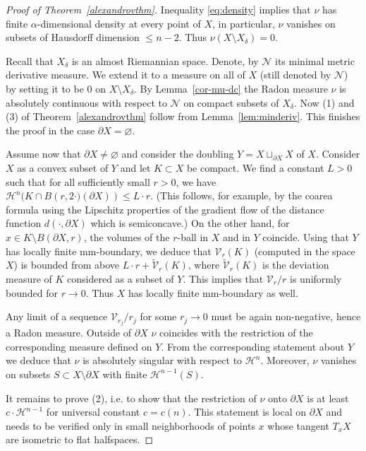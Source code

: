 \documentclass[12pt,leqno,intlimits]{amsart}
\numberwithin{equation}{section}
\theoremstyle{definition}
\theoremstyle{remark}
\newcommand{\tref}[1]{Theorem~\ref{#1}}
\newcommand{\lref}[1]{Lemma~\ref{#1}}
\def\emptyset{\varnothing}
\begin{document}
\begin{proof}[Proof of Theorem~\ref{alexandrovthm}]
Inequality \eqref{eq:density} implies that $\nu$ has finite $\alpha$-dimensional density at every point of $X$, in particular, $\nu$ vanishes on subsets of Hausdorff dimension $\leq n-2$.
Thus $\nu (X \setminus X_{\delta } )=0$.

Recall that $X_{\delta}$ is an almost Riemannian space. Denote, by $\mathcal N $ its minimal metric derivative measure. We extend it to a measure on all of $X$ (still denoted by $\mathcal N $) by setting it to be $0$ on $X\setminus X_{\delta}$.
By \lref{cor-mu-dc} the Radon measure $\nu$ is absolutely continuous with respect to $\mathcal N $ on compact subsets of $X_{\delta}$.
Now (1) and (3) of \tref{alexandrovthm} follow from \lref{lem:minderiv}.
This finishes the proof in the case $\partial X=\emptyset$.

Assume now that $\partial X\ne\emptyset$ and consider the doubling $Y=X\sqcup_{\partial X} X$ of $X$.
Consider $X$ as a convex subset of $Y$ and let $K\subset X$ be compact.
We find a constant $L>0$ such that for all sufficiently small $r>0$, we have
$\mathcal H^n (K\cap B(r,{2{\cdot})} (\partial X)) \leq L \cdot r$.
(This follows, for example, by the coarea formula using the Lipschitz properties of the gradient flow of the distance function $d(\cdot, \partial X)$ which is semiconcave.)
On the other hand, for $x\in K\setminus B (\partial X,r)$, the volumes of the $r$-ball in $X$ and in $Y$ coincide.
Using that $Y$ has locally finite mm-boundary, we deduce that $\mathcal{V}_r(K)$ (computed in the space $X$) is bounded from above $L\cdot r + \tilde{\mathcal{V}}_r (K)$, where $\tilde{\mathcal{V}}_r (K)$ is the deviation measure of $K$ considered as a subset of $Y$. This implies that $\mathcal{V}_r /r$ is uniformly bounded for $r\to 0$. Thus $X$ has locally finite mm-boundary as well.

Any limit of a sequence $\mathcal{V}_{r_j} /r_j$ for some $r_j\to 0$ must be again non-negative, hence a Radon measure. Outside of $\partial X$
$\nu$ coincides with the restriction of the corresponding measure defined on $Y$. From the corresponding statement about $Y$ we deduce that $\nu$ is absolutely singular with respect to $\mathcal H^n$. Moreover, $\nu$ vanishes on subsets $S\subset X\setminus \partial X$ with finite $\mathcal H^{n-1} (S)$.

It remains to prove (2), i.e. to show that the restriction of $\nu$ onto $\partial X$ is at least
$c\cdot \mathcal H^{n-1}$ for universal constant $c=c(n)$. This statement is local on $\partial X$ and needs to be verified only in small neighborhoods of points $x$ whose tangent $T_xX$
are isometric to flat halfspaces.


\end{proof}
\end{document}
